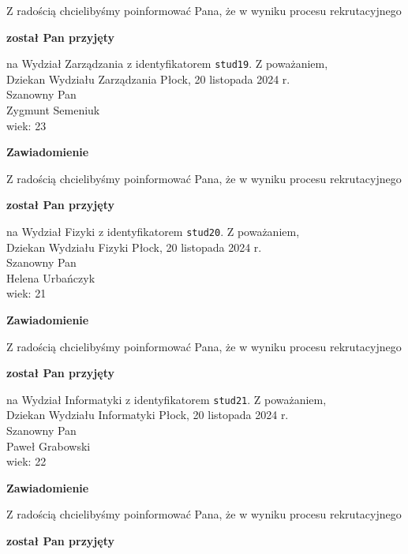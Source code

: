 \documentclass[12pt,a4paper]{article}
\begin{document}
\bigskip
Z radością chcielibyśmy poinformować Pana, że w wyniku procesu rekrutacyjnego 
\begin{center}
\textsf{\textbf{został Pan przyjęty}} 
\end{center}
na Wydział Zarządzania z identyfikatorem \verb|stud19|. 
\vspace{2cm}
\noindent
Z poważaniem,\\
Dziekan
Wydziału Zarządzania
\newpage
\hfill Płock, 20 listopada 2024 r.\\
\noindent 
Szanowny Pan \\
Zygmunt Semeniuk  \\
wiek: 23
\bigskip
\begin{center}
 	{\Large\textbf{Zawiadomienie}}
\end{center}
\bigskip
Z radością chcielibyśmy poinformować Pana, że w wyniku procesu rekrutacyjnego 
\begin{center}
\textsf{\textbf{został Pan przyjęty}} 
\end{center}
na Wydział Fizyki z identyfikatorem \verb|stud20|. 
\vspace{2cm}
\noindent
Z poważaniem,\\
Dziekan
Wydziału Fizyki
\newpage
\hfill Płock, 20 listopada 2024 r.\\
\noindent 
Szanowny Pan \\
Helena Urbańczyk \\
wiek: 21
\bigskip
\begin{center}
 	{\Large\textbf{Zawiadomienie}}
\end{center}
\bigskip
Z radością chcielibyśmy poinformować Pana, że w wyniku procesu rekrutacyjnego 
\begin{center}
\textsf{\textbf{został Pan przyjęty}} 
\end{center}
na Wydział Informatyki z identyfikatorem \verb|stud21|. 
\vspace{2cm}
\noindent
Z poważaniem,\\
Dziekan
Wydziału Informatyki
\newpage
\hfill Płock, 20 listopada 2024 r.\\
\noindent 
Szanowny Pan \\
Paweł Grabowski \\
wiek: 22
\bigskip
\begin{center}
 	{\Large\textbf{Zawiadomienie}}
\end{center}
\bigskip
Z radością chcielibyśmy poinformować Pana, że w wyniku procesu rekrutacyjnego 
\begin{center}
\textsf{\textbf{został Pan przyjęty}} 
\end{center}
\end{document}
